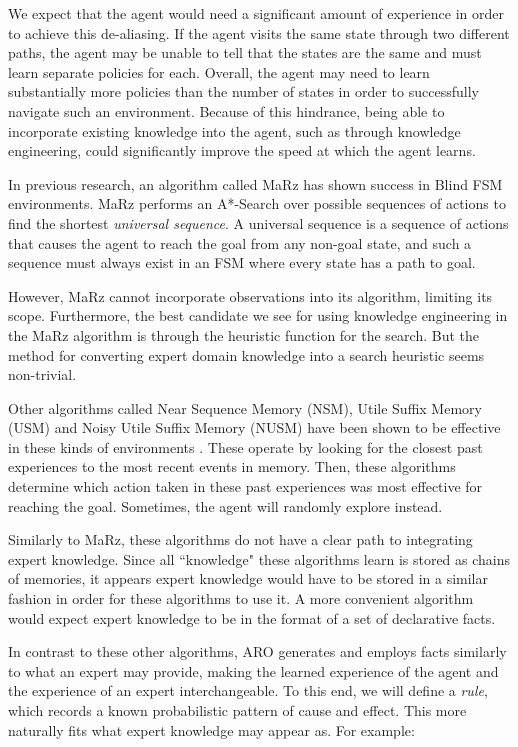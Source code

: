 \documentclass[letterpaper]{article} %
\begin{document}
We expect that the agent would need a significant amount of experience
in order to achieve this de-aliasing. If the agent visits the same
state through two different paths, the agent may be unable to tell
that the states are the same and must learn separate policies for
each. Overall, the agent may need to learn substantially more policies
than the number of states in order to successfully navigate such an
environment. Because of this hindrance, being able to incorporate
existing knowledge into the agent, such as through knowledge
engineering, could significantly improve the speed at which the agent
learns.

In previous research, an algorithm called MaRz \cite{Rodriguez17} has
shown success in Blind FSM environments.  MaRz performs an
A*-Search \cite{Russell09} over possible sequences of actions to find
the shortest \textit{universal sequence}.  A universal sequence is a
sequence of actions that causes the agent to reach the goal from any
non-goal state, and such a sequence must always exist in an FSM where every state has a path to goal.

However, MaRz cannot incorporate observations into its algorithm,
limiting its scope. Furthermore, the best candidate we see for using
knowledge engineering in the MaRz algorithm is through the heuristic
function for the search. But the method for converting expert domain
knowledge into a search heuristic seems non-trivial.

Other algorithms called Near Sequence Memory (NSM), Utile Suffix
Memory (USM) and Noisy Utile Suffix Memory (NUSM) have been shown to
be effective in these kinds of
environments \cite{McCallumNSM95,McCallumUSM95,Shani2005}. These
operate by looking for the closest past experiences to the most recent
events in memory. Then, these algorithms determine which action taken in 
these past experiences was most effective for reaching the goal.  Sometimes, 
the agent will randomly explore instead.

Similarly to MaRz, these algorithms do not have a clear path to
integrating expert knowledge. Since all ``knowledge" these algorithms learn
is stored as chains of memories, it appears expert knowledge would have
to be stored in a similar fashion in order for these algorithms to use it.
A more convenient algorithm would expect
expert knowledge to be in the format of a set of declarative facts.

In contrast to these other algorithms, ARO generates and employs facts
similarly to what an expert may provide, making the learned experience
of the agent and the experience of an expert interchangeable. To this
end, we will define a \textit{rule}, which records a known
probabilistic pattern of cause and effect. This more naturally fits
what expert knowledge may appear as. For example:
\end{document}
